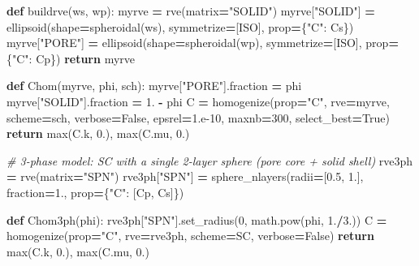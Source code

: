 \documentclass[
  a4paper,
  numbers=noendperiod,
  DIV=12]{scrreprt}
\newenvironment{Shaded}{\begin{snugshade}}{\end{snugshade}}
\newcommand{\BuiltInTok}[1]{#1}
\newcommand{\CommentTok}[1]{\textcolor[rgb]{0.56,0.35,0.01}{\textit{#1}}}
\newcommand{\ControlFlowTok}[1]{\textcolor[rgb]{0.13,0.29,0.53}{\textbf{#1}}}
\newcommand{\DecValTok}[1]{\textcolor[rgb]{0.00,0.00,0.81}{#1}}
\newcommand{\FloatTok}[1]{\textcolor[rgb]{0.00,0.00,0.81}{#1}}
\newcommand{\KeywordTok}[1]{\textcolor[rgb]{0.13,0.29,0.53}{\textbf{#1}}}
\newcommand{\NormalTok}[1]{#1}
\newcommand{\OperatorTok}[1]{\textcolor[rgb]{0.81,0.36,0.00}{\textbf{#1}}}
\newcommand{\StringTok}[1]{\textcolor[rgb]{0.31,0.60,0.02}{#1}}
\newcommand{\VariableTok}[1]{\textcolor[rgb]{0.00,0.00,0.00}{#1}}
\begin{document}
\begin{tcolorbox}
\begin{Shaded}
\begin{Highlighting}[]
\KeywordTok{def}\NormalTok{ buildrve(ws, wp):}
\NormalTok{    myrve }\OperatorTok{=}\NormalTok{ rve(matrix}\OperatorTok{=}\StringTok{"SOLID"}\NormalTok{)}
\NormalTok{    myrve[}\StringTok{"SOLID"}\NormalTok{] }\OperatorTok{=}\NormalTok{ ellipsoid(shape}\OperatorTok{=}\NormalTok{spheroidal(ws), symmetrize}\OperatorTok{=}\NormalTok{[ISO], prop}\OperatorTok{=}\NormalTok{\{}\StringTok{"C"}\NormalTok{: Cs\})}
\NormalTok{    myrve[}\StringTok{"PORE"}\NormalTok{]  }\OperatorTok{=}\NormalTok{ ellipsoid(shape}\OperatorTok{=}\NormalTok{spheroidal(wp),  symmetrize}\OperatorTok{=}\NormalTok{[ISO], prop}\OperatorTok{=}\NormalTok{\{}\StringTok{"C"}\NormalTok{: Cp\})}
    \ControlFlowTok{return}\NormalTok{ myrve}

\KeywordTok{def}\NormalTok{ Chom(myrve, phi, sch):}
\NormalTok{    myrve[}\StringTok{"PORE"}\NormalTok{].fraction  }\OperatorTok{=}\NormalTok{ phi}
\NormalTok{    myrve[}\StringTok{"SOLID"}\NormalTok{].fraction }\OperatorTok{=} \FloatTok{1.} \OperatorTok{{-}}\NormalTok{ phi}
\NormalTok{    C }\OperatorTok{=}\NormalTok{ homogenize(prop}\OperatorTok{=}\StringTok{"C"}\NormalTok{, rve}\OperatorTok{=}\NormalTok{myrve, scheme}\OperatorTok{=}\NormalTok{sch,}
\NormalTok{                   verbose}\OperatorTok{=}\VariableTok{False}\NormalTok{, epsrel}\OperatorTok{=}\FloatTok{1.e{-}10}\NormalTok{, maxnb}\OperatorTok{=}\DecValTok{300}\NormalTok{, select\_best}\OperatorTok{=}\VariableTok{True}\NormalTok{)}
    \ControlFlowTok{return} \BuiltInTok{max}\NormalTok{(C.k, }\FloatTok{0.}\NormalTok{), }\BuiltInTok{max}\NormalTok{(C.mu, }\FloatTok{0.}\NormalTok{)}

\CommentTok{\# 3{-}phase model: SC with a single 2{-}layer sphere (pore core + solid shell)}
\NormalTok{rve3ph }\OperatorTok{=}\NormalTok{ rve(matrix}\OperatorTok{=}\StringTok{"SPN"}\NormalTok{)}
\NormalTok{rve3ph[}\StringTok{"SPN"}\NormalTok{] }\OperatorTok{=}\NormalTok{ sphere\_nlayers(radii}\OperatorTok{=}\NormalTok{[}\FloatTok{0.5}\NormalTok{, }\FloatTok{1.}\NormalTok{], fraction}\OperatorTok{=}\FloatTok{1.}\NormalTok{, prop}\OperatorTok{=}\NormalTok{\{}\StringTok{"C"}\NormalTok{: [Cp, Cs]\})}

\KeywordTok{def}\NormalTok{ Chom3ph(phi):}
\NormalTok{    rve3ph[}\StringTok{"SPN"}\NormalTok{].set\_radius(}\DecValTok{0}\NormalTok{, math.}\BuiltInTok{pow}\NormalTok{(phi, }\FloatTok{1.}\OperatorTok{/}\FloatTok{3.}\NormalTok{))}
\NormalTok{    C }\OperatorTok{=}\NormalTok{ homogenize(prop}\OperatorTok{=}\StringTok{"C"}\NormalTok{, rve}\OperatorTok{=}\NormalTok{rve3ph, scheme}\OperatorTok{=}\NormalTok{SC, verbose}\OperatorTok{=}\VariableTok{False}\NormalTok{)}
    \ControlFlowTok{return} \BuiltInTok{max}\NormalTok{(C.k, }\FloatTok{0.}\NormalTok{), }\BuiltInTok{max}\NormalTok{(C.mu, }\FloatTok{0.}\NormalTok{)}


\end{Highlighting}
\end{Shaded}
\end{tcolorbox}
\end{document}
